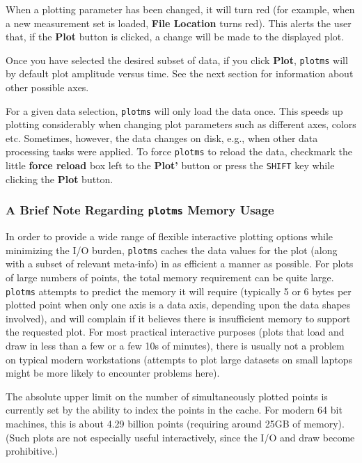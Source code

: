 When a plotting parameter has been changed, it will turn red (for
example, when a new measurement set is loaded, {\bf File Location}
turns red). This alerts the user that, if the {\bf Plot} button is
clicked, a change will be made to the displayed plot.

Once you have selected the desired subset of data, if you click {\bf
  Plot}, {\tt plotms} will by default plot amplitude versus time. See
the next section for information about other possible axes.

For a given data selection, {\tt plotms} will only load the data
once. This speeds up plotting considerably when changing plot
parameters such as different axes, colors etc. Sometimes, however,
the data changes on disk, e.g., when other data processing tasks were
applied. To force {\tt plotms} to reload the data, checkmark the
little {\bf force reload} box left to the {\bf Plot'} button or press
the {\tt SHIFT} key while clicking the {\bf Plot} button.

\subsubsection{A Brief Note Regarding {\tt plotms} Memory Usage}

In order to provide a wide range of flexible interactive plotting
options while minimizing the I/O burden, {\tt plotms} caches the data
values for the plot (along with a subset of relevant meta-info) in as
efficient a manner as possible.  For plots of large numbers of points,
the total memory requirement can be quite large. {\tt plotms} attempts
to predict the memory it will require (typically 5 or 6 bytes per
plotted point when only one axis is a data axis, depending upon the
data shapes involved), and will complain if it believes there is
insufficient memory to support the requested plot.  For most practical
interactive purposes (plots that load and draw in less than a few or a
few 10s of minutes), there is usually not a problem on typical modern
workstations (attempts to plot large datasets on small laptops might
be more likely to encounter problems here).

The absolute upper limit on the number of simultaneously plotted points
is currently set by the ability to index the points in the
cache.  For modern 64 bit machines, this is about 4.29 billion
points (requiring around 25GB of memory).   (Such plots are
not especially useful interactively, since the I/O and draw
become prohibitive.)

